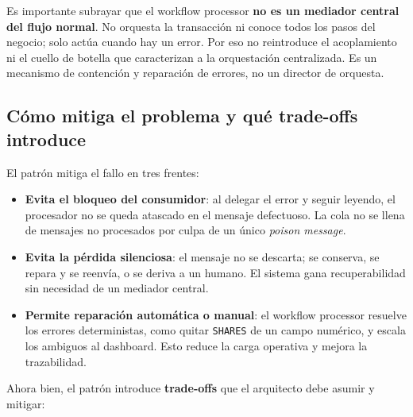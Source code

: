 \documentclass[12pt,a4paper]{article}
\begin{document}
Es importante subrayar que el workflow processor \textbf{no es un mediador central del flujo normal}. No orquesta la transacción ni conoce todos los pasos del negocio; solo actúa cuando hay un error. Por eso no reintroduce el acoplamiento ni el cuello de botella que caracterizan a la orquestación centralizada. Es un mecanismo de contención y reparación de errores, no un director de orquesta.

\subsection{Cómo mitiga el problema y qué trade-offs introduce}

El patrón mitiga el fallo en tres frentes:

\begin{itemize}[label=$\cdot$]
  \item \textbf{Evita el bloqueo del consumidor}: al delegar el error y seguir leyendo, el procesador no se queda atascado en el mensaje defectuoso. La cola no se llena de mensajes no procesados por culpa de un único \emph{poison message}.
  \item \textbf{Evita la pérdida silenciosa}: el mensaje no se descarta; se conserva, se repara y se reenvía, o se deriva a un humano. El sistema gana recuperabilidad sin necesidad de un mediador central.
  \item \textbf{Permite reparación automática o manual}: el workflow processor resuelve los errores deterministas, como quitar \texttt{SHARES} de un campo numérico, y escala los ambiguos al dashboard. Esto reduce la carga operativa y mejora la trazabilidad.
\end{itemize}

Ahora bien, el patrón introduce \textbf{trade-offs} que el arquitecto debe asumir y mitigar:
\end{document}
